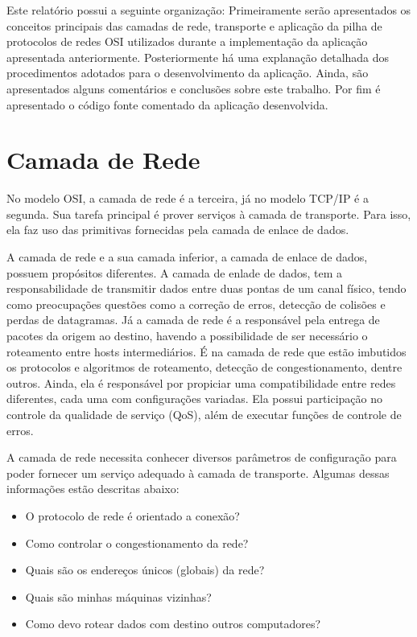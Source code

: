 \documentclass[brazil,times,12pt]{abnt}
\begin{document}
	Este relatório possui a seguinte organização: Primeiramente serão apresentados
	os conceitos principais das camadas de rede, transporte e aplicação da pilha de
	protocolos de redes OSI utilizados durante a implementação da aplicação
	apresentada anteriormente. Posteriormente há uma explanação detalhada dos
	procedimentos adotados para o desenvolvimento da aplicação. Ainda, são
	apresentados alguns comentários e conclusões sobre este trabalho. Por fim é
	apresentado o código fonte comentado da aplicação desenvolvida. 
	
\section*{Camada de Rede}
	No modelo OSI, a camada de rede é a terceira, já no modelo TCP/IP é a segunda.
	Sua tarefa principal é prover serviços à camada de transporte. Para isso, ela
	faz uso das primitivas fornecidas pela camada de enlace de dados.
	
	A camada de rede e a sua camada inferior, a camada de enlace de dados, possuem
	propósitos diferentes. A camada de enlade de dados, tem a
	responsabilidade de transmitir dados entre duas pontas de um canal físico,
	tendo como preocupações questões como a correção de erros, detecção de
	colisões e perdas de datagramas. Já a camada de rede é a responsável
	pela entrega de pacotes da origem ao destino, havendo a possibilidade de ser
	necessário o roteamento entre hosts intermediários. É na camada de rede que
	estão imbutidos os protocolos e algoritmos de roteamento, detecção de
	congestionamento, dentre outros. Ainda, ela é responsável por propiciar uma
	compatibilidade entre redes diferentes, cada uma com configurações variadas.
	Ela possui participação no controle da qualidade de serviço (QoS), além de
	executar funções de controle de erros.

	A camada de rede necessita conhecer diversos parâmetros de configuração para
	poder fornecer um serviço adequado à camada de transporte. Algumas dessas
	informações estão descritas abaixo:
	
	\begin{itemize}
		\item O protocolo de rede é orientado a conexão?
		\item Como controlar o congestionamento da rede?
		\item Quais são os endereços únicos (globais) da rede?
		\item Quais são minhas máquinas vizinhas?
		\item Como devo rotear dados com destino outros computadores?
	\end{itemize}
\end{document}
